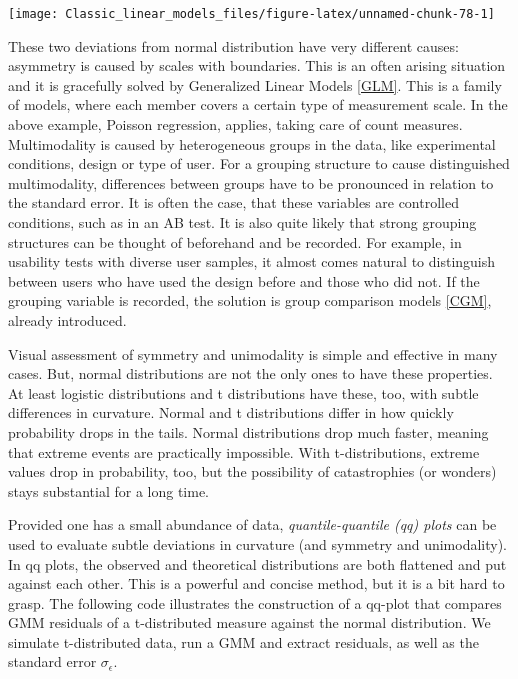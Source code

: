 \documentclass[]{svmono}
\newenvironment{Shaded}{\begin{snugshade}}{\end{snugshade}}
\newcommand{\KeywordTok}[1]{\textcolor[rgb]{0.13,0.29,0.53}{\textbf{#1}}}
\newcommand{\DataTypeTok}[1]{\textcolor[rgb]{0.13,0.29,0.53}{#1}}
\newcommand{\DecValTok}[1]{\textcolor[rgb]{0.00,0.00,0.81}{#1}}
\newcommand{\StringTok}[1]{\textcolor[rgb]{0.31,0.60,0.02}{#1}}
\newcommand{\OperatorTok}[1]{\textcolor[rgb]{0.81,0.36,0.00}{\textbf{#1}}}
\newcommand{\NormalTok}[1]{#1}
\begin{document}
\begin{Shaded}
\end{Shaded}

\texttt{[image: Classic\_linear\_models\_files/figure-latex/unnamed-chunk-78-1]}

These two deviations from normal distribution have very different
causes: asymmetry is caused by scales with boundaries. This is an often
arising situation and it is gracefully solved by Generalized Linear
Models \ref{GLM}. This is a family of models, where each member covers a
certain type of measurement scale. In the above example, Poisson
regression, applies, taking care of count measures. Multimodality is
caused by heterogeneous groups in the data, like experimental
conditions, design or type of user. For a grouping structure to cause
distinguished multimodality, differences between groups have to be
pronounced in relation to the standard error. It is often the case, that
these variables are controlled conditions, such as in an AB test. It is
also quite likely that strong grouping structures can be thought of
beforehand and be recorded. For example, in usability tests with diverse
user samples, it almost comes natural to distinguish between users who
have used the design before and those who did not. If the grouping
variable is recorded, the solution is group comparison models \ref{CGM},
already introduced.

Visual assessment of symmetry and unimodality is simple and effective in
many cases. But, normal distributions are not the only ones to have
these properties. At least logistic distributions and t distributions
have these, too, with subtle differences in curvature. Normal and t
distributions differ in how quickly probability drops in the tails.
Normal distributions drop much faster, meaning that extreme events are
practically impossible. With t-distributions, extreme values drop in
probability, too, but the possibility of catastrophies (or wonders)
stays substantial for a long time.

Provided one has a small abundance of data, \emph{quantile-quantile (qq)
plots} can be used to evaluate subtle deviations in curvature (and
symmetry and unimodality). In qq plots, the observed and theoretical
distributions are both flattened and put against each other. This is a
powerful and concise method, but it is a bit hard to grasp. The
following code illustrates the construction of a qq-plot that compares
GMM residuals of a t-distributed measure against the normal
distribution. We simulate t-distributed data, run a GMM and extract
residuals, as well as the standard error \(\sigma_\epsilon\).
\end{document}
